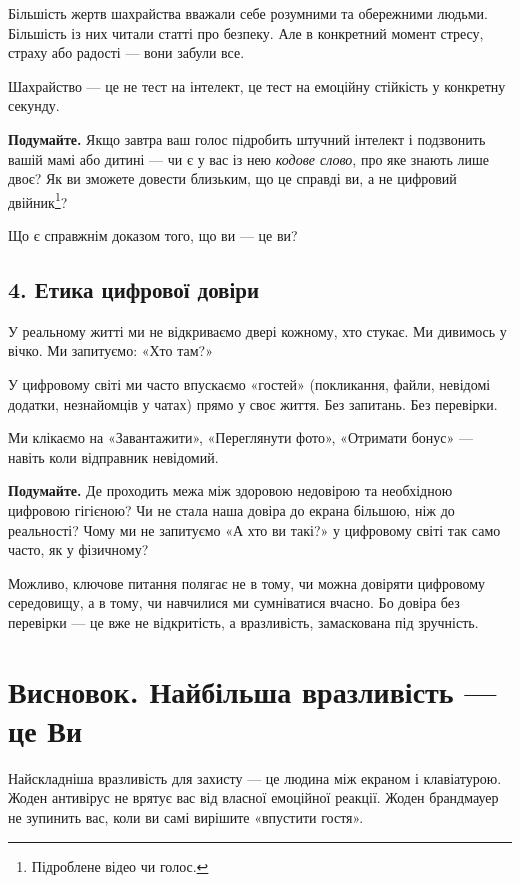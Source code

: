 Більшість жертв шахрайства вважали себе розумними та обережними людьми. Більшість із них читали статті про безпеку. Але в конкретний момент стресу, страху або радості — вони забули все.

Шахрайство — це не тест на інтелект, це тест на емоційну стійкість у конкретну секунду.

\textbf{Подумайте.} Якщо завтра ваш голос підробить штучний інтелект і подзвонить вашій мамі або дитині — чи є у вас із нею \textit{кодове слово}, про яке знають лише двоє? Як ви зможете довести близьким, що це справді ви, а не цифровий двійник\footnote{Підроблене відео чи голос.}? 

Що є справжнім доказом того, що ви — це ви?

\vspace{0.25cm}

\subsection*{4. Етика цифрової довіри}

У реальному житті ми не відкриваємо двері кожному, хто стукає. Ми дивимось у вічко. Ми запитуємо: «Хто там?» 

У цифровому світі ми часто впускаємо «гостей» (покликання, файли, невідомі додатки, незнайомців у чатах) прямо у своє життя. Без запитань. Без перевірки.

Ми клікаємо на «Завантажити», «Переглянути фото», «Отримати бонус» — навіть коли відправник невідомий.

\textbf{Подумайте.} Де проходить межа між здоровою недовірою та необхідною цифровою гігієною? Чи не стала наша довіра до екрана більшою, ніж до реальності? Чому ми не запитуємо «А хто ви такі?» у цифровому світі так само часто, як у фізичному?

Можливо, ключове питання полягає не в тому, чи можна довіряти цифровому середовищу, а в тому, чи навчилися ми сумніватися вчасно. Бо довіра без перевірки — це вже не відкритість, а вразливість, замаскована під зручність.

\vspace{0.3cm}

\section*{Висновок. Найбільша вразливість — це Ви}
\vspace{-0.1cm}

Найскладніша вразливість для захисту — це людина між екраном і клавіатурою. Жоден антивірус не врятує вас від власної емоційної реакції. Жоден брандмауер не зупинить вас, коли ви самі вирішите «впустити гостя».

